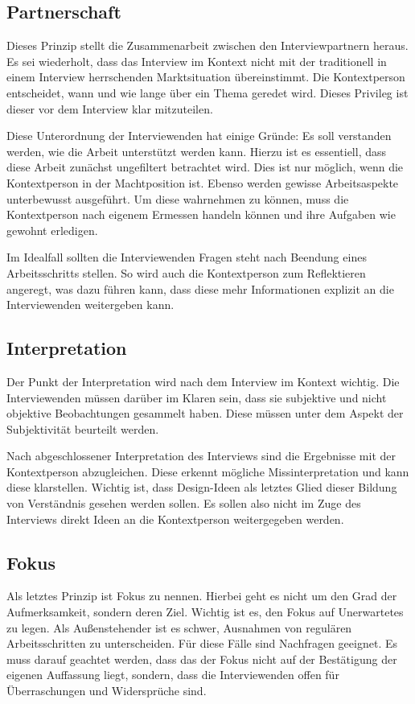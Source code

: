 \subsection{Partnerschaft}

Dieses Prinzip stellt die Zusammenarbeit zwischen den Interviewpartnern heraus.
Es sei wiederholt, dass das Interview im Kontext nicht mit der traditionell in einem Interview herrschenden Marktsituation übereinstimmt.
Die Kontextperson entscheidet, wann und wie lange über ein Thema geredet wird.
Dieses Privileg ist dieser vor dem Interview klar mitzuteilen.

Diese Unterordnung der Interviewenden hat einige Gründe:
Es soll verstanden werden, wie die Arbeit unterstützt werden kann.
Hierzu ist es essentiell, dass diese Arbeit zunächst ungefiltert betrachtet wird.
Dies ist nur möglich, wenn die Kontextperson in der Machtposition ist.
Ebenso werden gewisse Arbeitsaspekte unterbewusst ausgeführt.
Um diese wahrnehmen zu können, muss die Kontextperson nach eigenem Ermessen handeln können und ihre Aufgaben wie gewohnt erledigen.

Im Idealfall sollten die Interviewenden Fragen steht nach Beendung eines Arbeitsschritts stellen.
So wird auch die Kontextperson zum Reflektieren angeregt, was dazu führen kann, dass diese mehr Informationen explizit an die Interviewenden weitergeben kann.

\subsection{Interpretation}

Der Punkt der Interpretation wird nach dem Interview im Kontext wichtig.
Die Interviewenden müssen darüber im Klaren sein, dass sie subjektive und nicht objektive Beobachtungen gesammelt haben.
Diese müssen unter dem Aspekt der Subjektivität beurteilt werden.

Nach abgeschlossener Interpretation des Interviews sind die Ergebnisse mit der Kontextperson abzugleichen.
Diese erkennt mögliche Missinterpretation und kann diese klarstellen.
Wichtig ist, dass Design-Ideen als letztes Glied dieser Bildung von Verständnis gesehen werden sollen.
Es sollen also nicht im Zuge des Interviews direkt Ideen an die Kontextperson weitergegeben werden.

\subsection{Fokus}

Als letztes Prinzip ist Fokus zu nennen.
Hierbei geht es nicht um den Grad der Aufmerksamkeit, sondern deren Ziel.
Wichtig ist es, den Fokus auf Unerwartetes zu legen.
Als Außenstehender ist es schwer, Ausnahmen von regulären Arbeitsschritten zu unterscheiden.
Für diese Fälle sind Nachfragen geeignet.
Es muss darauf geachtet werden, dass das der Fokus nicht auf der Bestätigung der eigenen Auffassung liegt, sondern, dass die Interviewenden offen für Überraschungen und Widersprüche sind.
